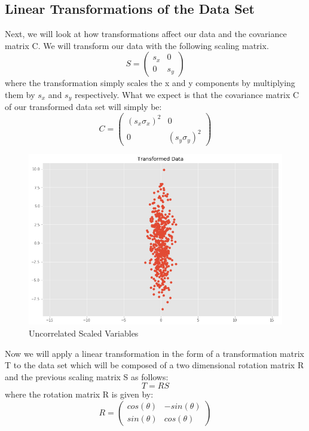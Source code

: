 \documentclass[11pt]{article}
\begin{document}
\subsection{Linear Transformations of the Data Set}
Next, we will look at how transformations affect our data and the covariance matrix C. We will transform our data with the following scaling matrix.
$$S = \left( \begin{array}{ccc}  s_x & 0 \\  0 & s_y \end{array} \right)$$
where the transformation simply scales the x and y components by multiplying them by $s_x$ and $s_y$ respectively. What we expect is that the covariance matrix C of our transformed data set will simply be:
$$C = \left( \begin{array}{ccc}  (s_x\sigma_x)^2 & 0 \\  0 & (s_y\sigma_y)^2 \end{array} \right)$$


\begin{figure}[h!]
  \centering
    \includegraphics[scale=0.3]{uncorrelated_scaled.png}  
   \caption{Uncorrelated Scaled Variables}
\end{figure}

Now we will apply a linear transformation in the form of a transformation matrix T to the data set which will be composed of a two dimensional rotation matrix R and the previous scaling matrix S as follows: $$T = RS$$ where the rotation matrix R is given by:
$$R = \left( \begin{array}{ccc}  cos(\theta) & -sin(\theta) \\  sin(\theta) & cos(\theta) \end{array} \right)$$
\end{document}
